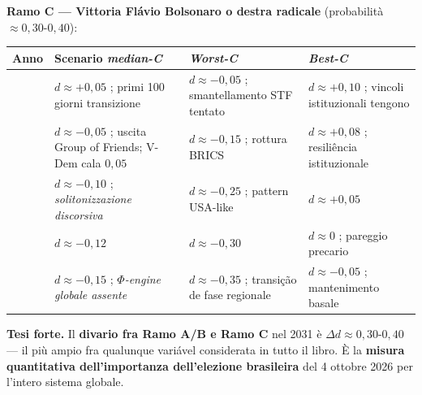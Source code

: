 \textbf{Ramo C --- Vittoria Flávio Bolsonaro o destra radicale}
(probabilità \(\approx 0{,}30\)-\(0{,}40\)):

{\def\LTcaptype{none} %
{\small\begin{longtable}[]{@{}
  >{\raggedright\arraybackslash}p{}
  >{\raggedright\arraybackslash}p{}
  >{\raggedright\arraybackslash}p{}
  >{\raggedright\arraybackslash}p{}@{}}
\toprule\noalign{}
\begin{minipage}[b]{\linewidth}\raggedright
Anno
\end{minipage} & \begin{minipage}[b]{\linewidth}\raggedright
Scenario \emph{median-C}
\end{minipage} & \begin{minipage}[b]{\linewidth}\raggedright
\emph{Worst-C}
\end{minipage} & \begin{minipage}[b]{\linewidth}\raggedright
\emph{Best-C}
\end{minipage} \\
\midrule\noalign{}
\endhead
\bottomrule\noalign{}
\endlastfoot
2027 & \(d \approx +0{,}05\) ; primi 100 giorni transizione &
\(d \approx -0{,}05\) ; smantellamento STF tentato &
\(d \approx +0{,}10\) ; vincoli istituzionali tengono \\
2028 & \(d \approx -0{,}05\) ; uscita Group of Friends; V-Dem cala
\(0{,}05\) & \(d \approx -0{,}15\) ; rottura BRICS &
\(d \approx +0{,}08\) ; resiliência istituzionale \\
2029 & \(d \approx -0{,}10\) ; \emph{solitonizzazione discorsiva} &
\(d \approx -0{,}25\) ; pattern USA-like & \(d \approx +0{,}05\) \\
2030 & \(d \approx -0{,}12\) & \(d \approx -0{,}30\) & \(d \approx 0\) ;
pareggio precario \\
2031 & \(d \approx -0{,}15\) ; \emph{$\Phi$-engine globale assente} &
\(d \approx -0{,}35\) ; transição de fase regionale &
\(d \approx -0{,}05\) ; mantenimento basale \\
\end{longtable}}
}

\Hypoth{} \textbf{Tesi forte.} Il \textbf{divario fra Ramo A/B e Ramo C}
nel 2031 è \(\Delta d \approx 0{,}30\)-\(0{,}40\) --- il più ampio fra
qualunque variável considerata in tutto il libro. È la \textbf{misura
quantitativa dell'importanza dell'elezione brasileira} del 4 ottobre
2026 per l'intero sistema globale.



